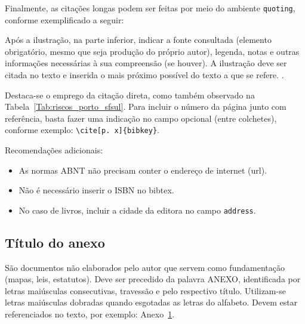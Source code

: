 \documentclass[
	12pt,				%
	oneside,			%
	a4paper,			%
	chapter=TITLE,		%
	section=TITLE,		%
	english,			%
	brazil,				%
	]{abntex2}
\begin{document}
\begin{apendicesenv}
    Finalmente, as citações longas podem ser feitas por meio do ambiente \verb|quoting|, conforme exemplificado a seguir:
    \begin{quoting}
        Após a ilustração, na parte inferior, indicar a fonte consultada (elemento obrigatório, mesmo que seja produção do próprio autor), legenda, notas e outras informações necessárias à sua compreensão (se houver).
        A ilustração deve ser citada no texto e inserida o mais próximo possível do texto a que se refere. \cite[p. 11]{NBR14724}.
    \end{quoting}
    Destaca-se o emprego da citação direta, como também observado na Tabela~\ref{Tab:riscos_porto_sfsul}. Para incluir o número da página junto com referência, basta fazer uma indicação no campo opcional (entre colchetes), conforme exemplo: \verb|\cite[p. x]{bibkey}|.

    Recomendações adicionais:
    \begin{itemize}
        \item As normas ABNT não precisam conter o endereço de internet (url).
        \item Não é necessário inserir o ISBN no bibtex.
        \item No caso de livros, incluir a cidade da editora no campo \verb|address|.
    \end{itemize}

\end{apendicesenv}

\begin{anexosenv}

    \chapter{Título do anexo}
    \label{Sec:exemplo_ane}

    São documentos não elaborados pelo autor que servem como fundamentação (mapas, leis, estatutos).
    Deve ser precedido da palavra ANEXO, identificada por letras maiúsculas consecutivas, travessão e pelo respectivo título.
    Utilizam-se letras maiúsculas dobradas quando esgotadas as letras do alfabeto.
    Devem estar referenciados no texto, por exemplo: Anexo~\ref{Sec:exemplo_ane}.

\end{anexosenv}
\end{document}
